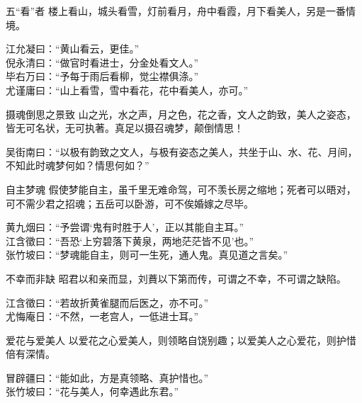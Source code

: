 \begin{yulu}{五“看”者}
楼上看山，城头看雪，灯前看月，舟中看霞，月下看美人，另是一番情境。
\begin{comments}
江允凝曰：“黄山看云，更佳。” \\
倪永清曰：“做官时看进士，分金处看文人。” \\
毕右万曰：“予每于雨后看柳，觉尘襟俱涤。” \\
尤谨庸曰：“山上看雪，雪中看花，花中看美人，亦可。”
\end{comments}
\end{yulu}

\begin{yulu}{摄魂倒思之景致}
山之光，水之声，月之色，花之香，文人之韵致，美人之姿态，皆无可名状，无可执著。真足以摄召魂梦，颠倒情思！
\begin{comments}
吴街南曰：“以极有韵致之文人，与极有姿态之美人，共坐于山、水、花、月间，不知此时魂梦何如？情思何如？”
\end{comments}
\end{yulu}

\begin{yulu}{自主梦魂}
假使梦能自主，虽千里无难命驾，可不羡长房之缩地；死者可以晤对，可不需少君之招魂；五岳可以卧游，可不俟婚嫁之尽毕。
\begin{comments}
黄九烟曰：“予尝谓‘鬼有时胜于人’，正以其能自主耳。” \\
江含徵曰：“吾恐‘上穷碧落下黄泉，两地茫茫皆不见’也。” \\
张竹坡曰：“梦魂能自主，则可一生死，通人鬼。真见道之言矣。”
\end{comments}
\end{yulu}

\begin{yulu}{不幸而非缺}
昭君以和亲而显，刘蕡以下第而传，可谓之不幸，不可谓之缺陷。
\begin{comments}
江含徵曰：“若故折黄雀腿而后医之，亦不可。” \\
尤悔庵日：“不然，一老宫人，一低进士耳。”
\end{comments}
\end{yulu}

\begin{yulu}{爱花与爱美人}
以爱花之心爱美人，则领略自饶别趣；以爱美人之心爱花，则护惜倍有深情。
\begin{comments}
冒辟疆曰：“能如此，方是真领略、真护惜也。” \\
张竹坡曰：“花与美人，何幸遇此东君。”
\end{comments}
\end{yulu}

